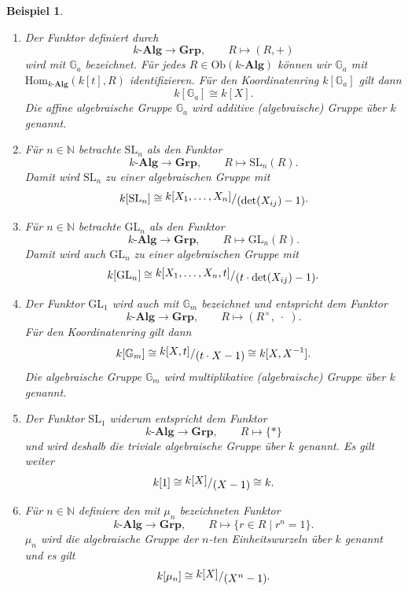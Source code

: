 \documentclass[a4paper, 11pt]{scrartcl}
\newcommand{\N}{\mathbb{N}}
\newcommand{\ringquot}[2]{{\raisebox{.2em}{\(#1\)}/\raisebox{-.2em}{\(#2\)}}}
\newcommand{\Hom}{\text{Hom}}
\newcommand{\Ob}{\text{Ob}}
\theoremstyle{basicstyle}
\newtheorem{beispiel}[definition]{Beispiel}
\begin{document}
    \begin{beispiel}
        \begin{enumerate}
            \item Der Funktor definiert durch
                \[k\textbf{-Alg} \longrightarrow \textbf{Grp}, \qquad R \mapsto (R, +)\]
                wird mit \(\mathbb{G}_a\) bezeichnet.
                Für jedes \(R \in \Ob(k\textbf{-Alg})\) können wir \(\mathbb{G}_a\) mit \(\Hom_{k\textbf{-Alg}}(k[t], R)\) identifizieren.
                Für den Koordinatenring \(k[\mathbb{G}_a]\) gilt dann \[k[\mathbb{G}_a] \cong k[X].\]
                Die affine algebraische Gruppe \(\mathbb{G}_a\) wird \emph{additive (algebraische) Gruppe über \(k\)} genannt.

            \item Für \(n \in \N\) betrachte \(\text{SL}_n\) als den Funktor
                \[k\textbf{-Alg} \longrightarrow \textbf{Grp}, \qquad R \mapsto \text{SL}_n(R).\]
                Damit wird \(\text{SL}_n\) zu einer algebraischen Gruppe mit
                \[k[\text{SL}_n] \cong \ringquot{k[X_1, \ldots, X_n]}{(\det (X_{ij}) - 1)}.\]

            \item Für \(n \in \N\) betrachte \(\text{GL}_n\) als den Funktor
                \[k\textbf{-Alg} \longrightarrow \textbf{Grp}, \qquad R \mapsto \text{GL}_n(R).\]
                Damit wird auch \(\text{GL}_n\) zu einer algebraischen Gruppe mit
                \[k[\text{GL}_n] \cong \ringquot{k[X_1, \ldots, X_n, t]}{(t \cdot \det(X_{ij}) - 1)}.\]

            \item Der Funktor \(\text{GL}_1\) wird auch mit \(\mathbb{G}_m\) bezeichnet und entspricht dem Funktor
                \[k\textbf{-Alg} \longrightarrow \textbf{Grp}, \qquad R \mapsto (R^\times, \;\cdot\;).\]
                Für den Koordinatenring gilt dann
                \[k[\mathbb{G}_m] \cong \ringquot{k[X, t]}{(t \cdot X - 1)} \cong k[X, X^{-1}].\]
                Die algebraische Gruppe \(\mathbb{G}_m\) wird \emph{multiplikative (algebraische) Gruppe über \(k\)} genannt.

            \item Der Funktor \(\text{SL}_1\) widerum entspricht dem Funktor
                \[k\textbf{-Alg} \longrightarrow \textbf{Grp}, \qquad R \mapsto \{\ast\}\]
                und wird deshalb die \emph{triviale algebraische Gruppe über \(k\)} genannt.
                Es gilt weiter
                \[k[1] \cong \ringquot{k[X]}{(X-1)} \cong k.\]

            \item Für \(n \in \N\) definiere den mit \(\mu_n\) bezeichneten Funktor
                \[k\textbf{-Alg} \longrightarrow \textbf{Grp}, \qquad R \mapsto \{r \in R \;\vert\; r^n = 1\}.\]
                \(\mu_n\) wird die \emph{algebraische Gruppe der \(n\)-ten Einheitswurzeln über \(k\)} genannt und es gilt
                \[k[\mu_n] \cong \ringquot{k[X]}{(X^n - 1)}.\]
        \end{enumerate}
    \end{beispiel}
\end{document}
